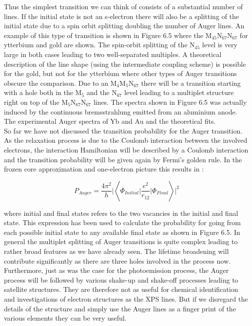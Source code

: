 Thus the simplest transition we can think of consists of a substantial number of lines. If the initial state is not an s-electron there will also be a splitting of the initial state due to a spin orbit splitting doubling the number of Auger lines. An example of this type of transition is shown in Figure 6.5 where the M$_{45}$N$_{67}$N$_{67}$ for ytterbium and gold are shown. The spin-orbit splitting of the N$_{45}$ level is very large in both cases leading to two well-separated multiples. A theoretical description of the line shape (using the intermediate coupling  scheme) is possible for the gold, but not for the ytterbium where other types of Auger transitions obscure the comparison. Due to an M$_{4}$M$_{5}$N$_{67}$ there will be a transition starting with a hole both in the M$_{5}$ and the N$_{67}$ level leading to a multiplet structure right on top of the M$_{5}$N$_{67}$N$_{67}$ lines. The spectra shown in Figure 6.5 was actually induced by the continuous bremsstrahlung emitted from an aluminium anode.\\

          \vspace*{15cm}
           The experimental Auger spectra of
          Yb and Au and the theoretical fits.\\


So far we have not discussed the transition probability for the Auger transition. As the relaxation process is due to the Coulomb interaction between the involved electrons, the interaction Hamiltonian will be described by a Coulomb interaction and the transition probability will be given again by Fermi's golden rule. In the frozen core approximation and one-electron picture this results in \cite{wentzel}:

\begin{equation}
P_{Auger}=\frac{4\pi^2}{h}\vert \left< \Phi_{Initial}\vert \frac{e^2}{r_{12}}\vert \Phi_{Final}\right>\vert ^2
\end{equation}

where initial and final states refers to the two vacancies in the initial and final state. This expression has been used to calculate the probability for going from each possible initial state to any available final state as shown in Figure 6.5. In general the multiplet splitting of Auger transitions is quite complex leading to rather broad features as we have already seen. The lifetime broadening will contribute significantly as there are three holes involved in the process now. Furthermore, just as was  the case for the photoemission process, the Auger process will be followed by various shake-up and shake-off processes leading to satellite structures. They are therefore not as useful for chemical identification and investigations of electron structures as the XPS lines. But if we disregard the details of the structure and simply use the Auger lines as a finger print of the various elements they can be very useful.

